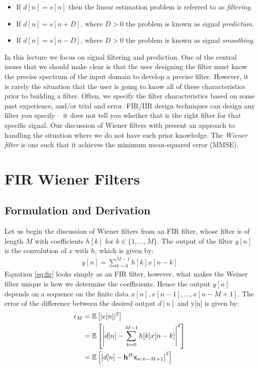 \documentclass[12pt]{article}
\begin{document}
\begin{itemize}
  \item If $d[n] = s[n]$ then the linear estimation problem is referred to as {\em filtering}. 
  \item If $d[n] = s[n+D]$, where $D > 0$ the problem is known as signal {\em prediction}. 
  \item If $d[n] = s[n-D]$, where $D > 0$ the problem is known as signal {\em smoothing}. 
\end{itemize}

In this lecture we focus on signal filtering and prediction. One of the central issues that we should make clear is that the user designing the filter must know the precise spectrum of the input domain to develop a precise filter. However, it is rarely the situation that the user is going to know all of these characteristics prior to building a filter. Often, we specify the filter characteristics based on some past experience, and/or trial and error. FIR/IIR design techniques can design any filter you specify -- it does not tell you whether that is the right filter for that specific signal. Our discussion of Wiener filters with present an approach to handling the situation where we do not have such prior knowledge. The {\em Wiener filter} is one such that it achieves the minimum mean-squared error (MMSE). 



\section{FIR Wiener Filters}


\subsection{Formulation and Derivation}
Let us begin the discussion of Wiener filters from an FIR filter, whose filter is of length $M$ with coefficients $h[k]$ for $k \in \{1,\ldots,M\}$. The output of the filter $y[n]$ is the convolution of $x$ with $h$, which is given by: 
\begin{align}
  y[n] = \sum_{k=0}^{M-1} h[k] x[n-k] \label{eq:fir}
\end{align}
Equation \eqref{eq:fir} looks simply as an FIR filter, however, what makes the Weiner filter unique is how we determine the coefficients. Hence the output $y[n]$ depends on a sequence on the finite data $x[n],x[n-1],\ldots,x[n-M+1]$. The error of the difference between the desired output $d[n]$ and y[n] is given by:
\begin{align}
  \epsilon_M &= {\mathbb E}\left[ |e[n]|^2 \right] \nonumber \\
  &= {\mathbb E}\left[ \left| d[n] -  \sum_{k=0}^{M-1} h[k] x[n-k] \right|^2 \right] \label{eq:error}\\
  &= {\mathbb E}\left[ \left| d[n] - {\mathbf h}^{H}{\mathbf x}_{n:n-M+1}\right|^2 \right]
\end{align}
\end{document}
